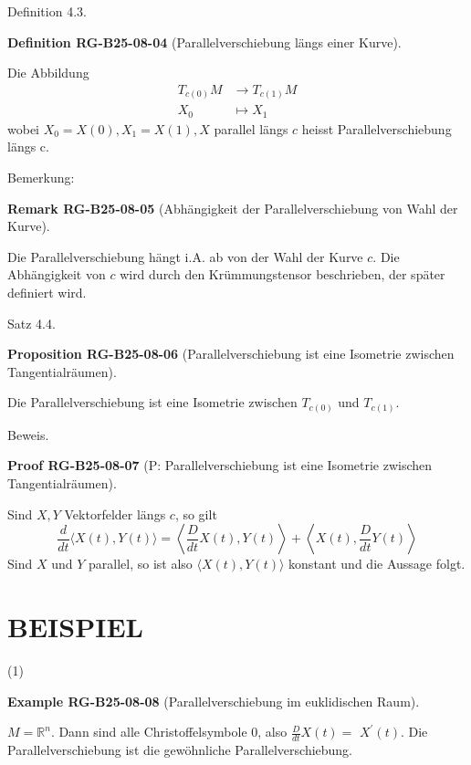 \documentclass[10pt, letterpaper]{article}
\newcommand{\CustomHeading}[3]{%
  \par\medskip\noindent%
  \textbf{#1 #2} \textnormal{(#3)}.\enskip%
}
\newenvironment{DEF}[2]{\begin{unitbox}\CustomHeading{Definition}{#1}{#2}}{\end{unitbox}}
\newenvironment{PROP}[2]{\begin{unitbox}\CustomHeading{Proposition}{#1}{#2}}{\end{unitbox}}
\newenvironment{REM}[2]{\begin{unitbox}\CustomHeading{Remark}{#1}{#2}}{\end{unitbox}}
\newenvironment{EXA}[2]{\begin{unitbox}\CustomHeading{Example}{#1}{#2}}{\end{unitbox}}
\newenvironment{PROOF}[2]{\begin{unitbox}\CustomHeading{Proof}{#1}{#2}}{\end{unitbox}}
\begin{document}
Definition 4.3. 


\begin{DEF}{RG-B25-08-04}{Parallelverschiebung längs einer Kurve}
Die Abbildung
$$
\begin{aligned}
T_{c(0)} M & \rightarrow T_{c(1)} M \\
X_{0} & \mapsto X_{1}
\end{aligned}
$$
wobei $X_{0}=X(0), X_{1}=X(1), X$ parallel längs $c$ heisst Parallelverschiebung längs c.
\end{DEF}



Bemerkung: 


\begin{REM}{RG-B25-08-05}{Abhängigkeit der Parallelverschiebung von Wahl der Kurve}
Die Parallelverschiebung hängt i.A. ab von der Wahl der Kurve $c$. Die Abhängigkeit von $c$ wird durch den Krümmungstensor beschrieben, der später definiert wird.
\end{REM}



Satz 4.4. 

\begin{PROP}{RG-B25-08-06}{Parallelverschiebung ist eine Isometrie zwischen Tangentialräumen}
Die Parallelverschiebung ist eine Isometrie zwischen $T_{c(0)}$ und $T_{c(1)}$.
\end{PROP}

Beweis.


\begin{PROOF}{RG-B25-08-07}{P: Parallelverschiebung ist eine Isometrie zwischen Tangentialräumen}
Sind $X, Y$ Vektorfelder längs $c$, so gilt
$$
\frac{d}{d t}\langle X(t), Y(t)\rangle=\left\langle\frac{D}{d t} X(t), Y(t)\right\rangle+\left\langle X(t), \frac{D}{d t} Y(t)\right\rangle
$$
Sind $X$ und $Y$ parallel, so ist also $\langle X(t), Y(t)\rangle$ konstant und die Aussage folgt.
\end{PROOF}



\section*{BEISPIEL}


(1) 

\begin{EXA}{RG-B25-08-08}{Parallelverschiebung im euklidischen Raum}
$M=\mathbb{R}^{n}$. Dann sind alle Christoffelsymbole 0, also $\frac{D}{d t} X(t)=$ $X^{\prime}(t)$. Die Parallelverschiebung ist die gewöhnliche Parallelverschiebung.
\end{EXA}
\end{document}
